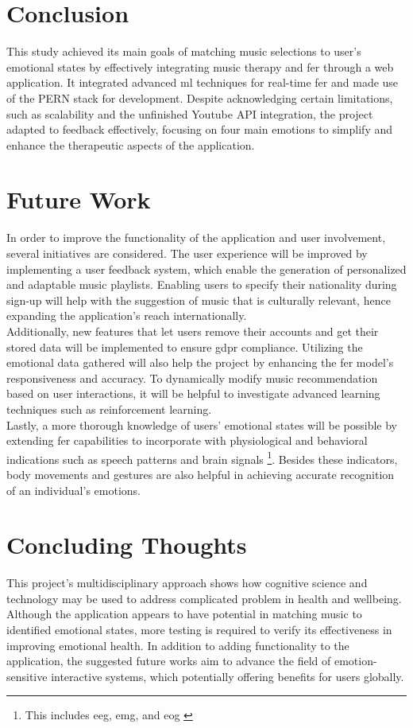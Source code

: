 \section{Conclusion}
This study achieved its main goals of matching music selections to user's emotional states by effectively integrating music therapy and \gls{fer} through a web application.
It integrated advanced \gls{ml} techniques for real-time \gls{fer} and made use of the PERN stack for development.
Despite acknowledging certain limitations, such as scalability and the unfinished Youtube API integration, the project adapted to feedback effectively, focusing on four main emotions to simplify and enhance the therapeutic aspects of the application.
\\
\section{Future Work}
In order to improve the functionality of the application and user involvement, several initiatives are considered.
The user experience will be improved by implementing a user feedback system, which enable the generation of personalized and adaptable music playlists.
Enabling users to specify their nationality during sign-up will help with the suggestion of music that is culturally relevant, hence expanding the application's reach internationally.
\\
\indent Additionally, new features that let users remove their accounts and get their stored data will be implemented to ensure \gls{gdpr} compliance.\citep{gdpr_2018_general} 
Utilizing the emotional data gathered will also help the project by enhancing the \gls{fer} model's responsiveness and accuracy.
To dynamically modify music recommendation based on user interactions, it will be helpful to investigate advanced learning techniques such as reinforcement learning.
\\
\indent Lastly, a more thorough knowledge of users' emotional states will be possible by extending \gls{fer} capabilities to incorporate with physiological and behavioral indications such as speech patterns and brain signals \footnote{This includes \gls{eeg}, \gls{emg}, and \gls{eog} \citep{shin_2018_inner}}.
Besides these indicators, body movements and gestures are also helpful in achieving accurate recognition of an individual's emotions.

\section{Concluding Thoughts}
This project's multidisciplinary approach shows how cognitive science and technology  may be used to address complicated problem in health and wellbeing.
Although the application appears to have potential in matching music to identified emotional states, more testing is required to verify its effectiveness in improving emotional health. 
In addition to adding functionality to the application, the suggested future works aim to advance the field of emotion-sensitive interactive systems, which potentially offering benefits for users globally.
